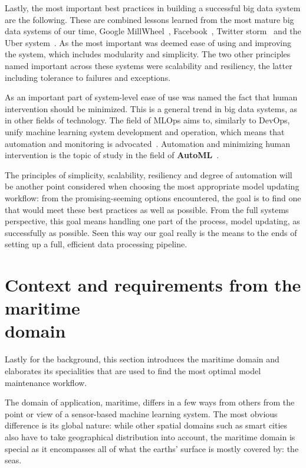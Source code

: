 Lastly, the most important best practices in building a successful big data system are the following. These are combined lessons learned from the most mature big data systems of our time, Google MillWheel~\cite{millwheel}, Facebook~\cite{facebook}, Twitter storm~\cite{storm@twitter} and the Uber system~\cite{uber}. As the most important was deemed ease of using and improving the system, which includes modularity and simplicity. The two other principles named important across these systems were scalability and resiliency, the latter including tolerance to failures and exceptions. 

As an important part of system-level ease of use was named the fact that human intervention should be minimized. This is a general trend in big data systems, as in other fields of technology. The field of MLOps aims to, similarly to DevOps, unify machine learning system development and operation, which means that automation and monitoring is advocated~\cite{googlemlops}. Automation and minimizing human intervention is the topic of study in the field of \textbf{AutoML}~\cite{celikAdaptationStrategiesAutomated2021}.


The principles of simplicity, scalability, resiliency and degree of automation will be another point considered when choosing the most appropriate model updating workflow: from the promising-seeming options encountered, the goal is to find one that would meet these best practices as well as possible. From the full systems perspective, this goal means handling one part of the process, model updating, as successfully as possible. Seen this way our goal really is the means to the ends of setting up a full, efficient data processing pipeline.

\section[Context and requirements from the maritime domain]{Context and requirements from the maritime\\ domain}

Lastly for the background, this section introduces the maritime domain and elaborates its specialities that are used to find the most optimal model maintenance workflow.

The domain of application, maritime, differs in a few ways from others from the point or view of a sensor-based machine learning system. The most obvious difference is its global nature: while other spatial domains such as smart cities also have to take geographical distribution into account, the maritime domain is special as it encompasses all of what the earths' surface is mostly covered by: the seas. 

